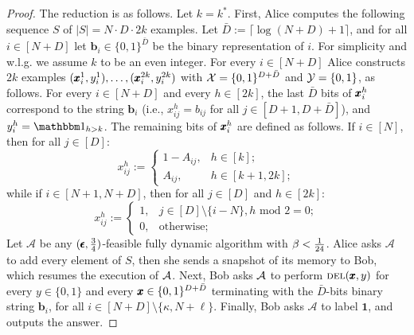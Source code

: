 \begin{proof}
The reduction is as follows. Let $k=k^*$. First, Alice computes the following sequence $S$ of $|S|=N \cdot D \cdot 2k$ examples. Let $\bar{D} := \lceil \log (N + D ) + 1 \rceil $, and for all $i \in [N+D]$ let $\pmb{b}_{i} \in \{0,1\}^{\bar D}$ be the binary representation of $i$. For simplicity and w.l.g. we assume $k$ to be an even integer. For every $i \in [N+D]$ Alice constructs $2k$ examples $(\pmb{x}_{i}^1,y_{i}^1) ,\dots,(\pmb{x}_{i}^{2k},y_{i}^{2k})$ with $\mathcal{X} = \{0,1\}^{D+\bar D}$ and $\mathcal{Y}=\{0,1\}$, as follows. For every $i \in [N+D]$ and every $h \in [2k]$, the last $\bar D$ bits of $\pmb{x}_i^h$ correspond to the string $\pmb{b}_i$ (i.e., $x_{ij}^h = b_{ij}$ for all $j \in [D+1,D+\bar D]$), and $y_i^h = \Ind_{h > k}$. The remaining bits of $\pmb{x}_i^h$ are defined as follows. If $i \in [N]$, then for all $j \in [D]$:
\[
x_{ij}^h:=
\begin{cases}
1-A_{ij},& h \in [k];  \\
A_{ij},& h \in [k+1,2k];
\end{cases}
\]
while if $i \in [N+1,N+D]$, then for all $j \in [D]$ and $h \in [2k]$:
\[
x_{ij}^h:=
\begin{cases}
1, & j \in [D] \setminus \{i-N\}, h \textrm{ mod } 2 = 0; \\
0, & \textrm {otherwise;}
\end{cases}
\]
Let $\mathcal{A}$ be any $(\pmb{\epsilon},\frac34)$-feasible fully dynamic algorithm with $\beta < \frac1{24}$. Alice asks $\mathcal{A}$ to add every element of $S$, then she sends a snapshot of its memory to Bob, which resumes the execution of $\mathcal{A}$. Next, Bob asks $\mathcal{A}$ to perform $\textsc{del}(\pmb{x}, y)$ for every $y \in \{0,1\}$ and every $\pmb{x} \in \{0,1\}^{D+\bar D}$ terminating with the $\bar D$-bits binary string $\pmb{b}_i$, for all $i \in [N + D] \setminus \{\kappa, N + \ell\}$. Finally, Bob asks $\mathcal{A}$ to label $\pmb{1}$, and outputs the answer.


\end{proof}
